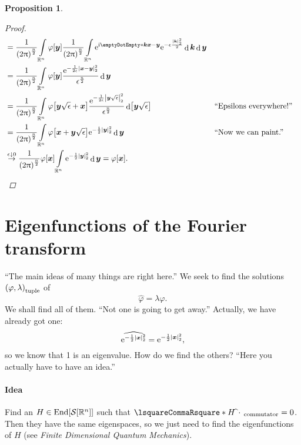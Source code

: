 \documentclass[10pt]{article}
\newtheorem*{proposition}{Proposition}
\DeclarePairedDelimiter\singleBars{\lvert}{\rvert}
\DeclarePairedDelimiter\parentheses{\lparen}{\rparen}
\DeclarePairedDelimiter\squareBrackets{[}{]}
\newcommand\I{\mathrm{i}}
\newcommand\E{\mathrm{e}}
\DeclareMathOperator{\diffd}{d}
\DeclareMathOperator{\End}{End}
\newcommand\ft\widehat
\newcommand{\R}{\mathbb{R}}
\newcommand{\SchwartzSpace}{\mathcal{S}}
\newcommand\of[1]{\parentheses*{#1}}
\newcommand\pa[1]{\parentheses*{#1}}
\newcommand\tuple[1]{\parentheses*{#1}}
\newcommand\norm[1]{\singleBars*{#1}}
\newcommand\commutator[2]{\lsquareCommaRsquare*{#1}{#2}}
\newcommand\scal[2]{\emptyDotEmpty*{#1}{#2}}
\newcommand\gl\lambda
\newcommand\gj\varphi
\renewcommand\ge\epsilon
\newcommand{\vx}{{\vectorsym x}}
\newcommand{\vy}{{\vectorsym y}}
\newcommand{\vk}{{\vectorsym k}}
\newcommand\placeholder{\,\:\cdot\:\,}
\renewcommand\of[1]{\squareBrackets*{#1}}
\renewcommand\norm[1]{\singleBars*{#1}_{2}}
\renewcommand\tuple[1]{\parentheses*{#1}_{\mathrm{tuple}}}
\renewcommand\commutator[2]{\lsquareCommaRsquare*{#1}{#2}_{\mathrm{commutator}}}
\newcommand\Int[1]{\int\limits_{#1}}
\newcommand{\Rn}{{\R^n}}
\newcommand{\Schwartz}{{\SchwartzSpace\of{\Rn}}}
\newcommand{\ftnrm}{\frac{1}{\pa{2\Pi}^\frac{n}{2}} }
\begin{document}
\begin{proposition}
\begin{proof}
\begin{align*}
         &=\ftnrm\Int\Rn\gj\of\vy\ftnrm\Int\Rn\E^{\I\scal\vk{\pascal{\vx-\vy}}}
        \E^{-\ge\frac{\norm\vk^2}{2}}\diffd\vk\diffd\vy\\
        &=\ftnrm\Int\Rn\gj\of\vy\frac{\E^{-\frac{1}{2\ge}\norm{\vx-\vy}^2}}
        {\ge^\frac{n}{2}}\diffd\vy \\
        &=\ftnrm\Int\Rn\gj\of{\vy\sqrt\ge+\vx}\frac{\E^{-\frac{1}{2\ge}\norm{\vy\sqrt\ge}^2}}
        {\ge^\frac{n}{2}}\diffd\of{\vy\sqrt\ge} && \text{``Epsilons everywhere!''}\\    
        &=\ftnrm\Int\Rn\gj\of{\vx+\vy\sqrt\ge}\E^{-\frac{1}{2}\norm\vy^2}\diffd\vy
        && \text{``Now we can paint.''}\\
        &\overset{\ge\downarrow 0}{\rightarrow}
        \ftnrm\gj\of\vx\Int\Rn\E^{-\frac{1}{2}\norm\vy^2}\diffd\vy =\gj\of\vx.
      \end{align*}
    \end{proof}
  \end{proposition}
  
  \section{Eigenfunctions of the Fourier transform}
  ``The main ideas of many things are right here.''
  We seek to find the solutions $\tuple{\gj,\gl}$ of
  \begin{equation*}
    \ft\gj=\gl\gj .
  \end{equation*}
  We shall find all of them. ``Not one is going to get away.'' Actually, we have already got one:
  \begin{equation*}
    \ft{\E^{-\frac{1}{2}\norm\vx^2}}=\E^{-\frac{1}{2}\norm\vx^2},
  \end{equation*}
  so we know that 1 is an eigenvalue. How do we find the others? ``Here you actually have to have an idea.''
  
  \paragraph{Idea}
  Find an $H\in\End\of\Schwartz$ such that $\commutator H {\ft\placeholder} = 0$. Then they have the same eigenspaces, so we just need to find the eigenfunctions of $H$ (see \emph{Finite Dimensional Quantum Mechanics}).
  
\end{document}

